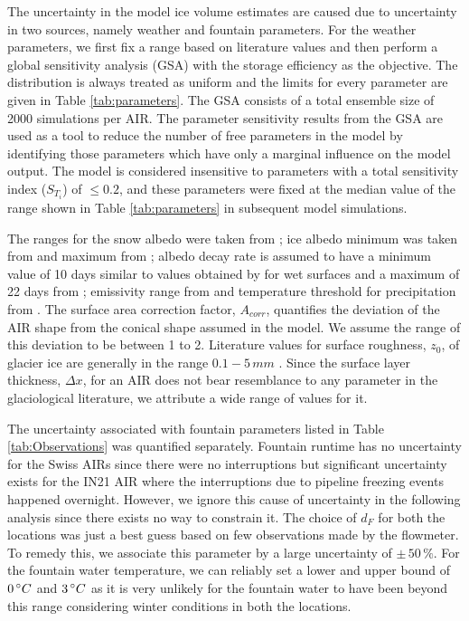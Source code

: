 \documentclass[utf8]{frontiersSCNS} %
\begin{document}
The uncertainty in the model ice volume estimates are caused due to uncertainty in two sources, namely weather
and fountain parameters. For the weather parameters, we first fix a range based on literature values and then perform a
global sensitivity analysis (GSA) with the storage efficiency as the objective. The distribution is always treated
as uniform and the limits for every parameter are given in Table \ref{tab:parameters}. The GSA consists of a total
ensemble size of 2000 simulations per AIR. The parameter sensitivity results from the GSA are used as a tool to
reduce the number of free parameters in the model by identifying those parameters which have only a marginal
influence on the model output. The model is considered insensitive to parameters with a total sensitivity index
($S_{T_{i}}$) of $\leq 0.2$, and these parameters were fixed at the median value of the range shown in Table
\ref{tab:parameters} in subsequent model simulations.

The ranges for the snow albedo were taken from \cite{ZollesMaussion_2019}; ice albedo minimum was taken from
\cite{steiner_2015} and maximum from \cite{ZollesMaussion_2019}; albedo decay rate is assumed to have a minimum
value of 10 days similar to values obtained by \cite{Schmidt_2017} for wet surfaces and a maximum of 22 days from
\cite{OerlemansKnap_1998}; emissivity range from \cite{steiner_2015} and temperature threshold for precipitation
from \cite{Zhou_2010}. The surface area correction factor, $A_{corr}$, quantifies the deviation of the AIR shape
from the conical shape assumed in the model. We assume the range of this deviation to be between 1 to 2. Literature
values for surface roughness, $z_{0}$, of glacier ice are generally in the range $0.1-5\, mm$
\citep{BrockWillisSharp_2006}. Since the surface layer thickness, $\Delta x$, for an AIR does not bear resemblance
to any parameter in the glaciological literature, we attribute a wide range of values for it.

The uncertainty associated with fountain parameters listed in Table \ref{tab:Observations} was quantified
separately. Fountain runtime has no uncertainty for the Swiss AIRs since there were no interruptions but
significant uncertainty exists for the IN21 AIR where the interruptions due to pipeline freezing events happened
overnight. However, we ignore this cause of uncertainty in the following analysis since there exists no way to
constrain it. The choice of $d_F$ for both the locations was just a best guess based on few observations made by
the flowmeter. To remedy this, we associate this parameter by a large uncertainty of $\pm \,50\, \%$. For the
fountain water temperature, we can reliably set a lower and upper bound of $0\, \degree C$ and $3\, \degree C$ as
it is very unlikely for the fountain water to have been beyond this range considering winter conditions in both the
locations.
\end{document}
